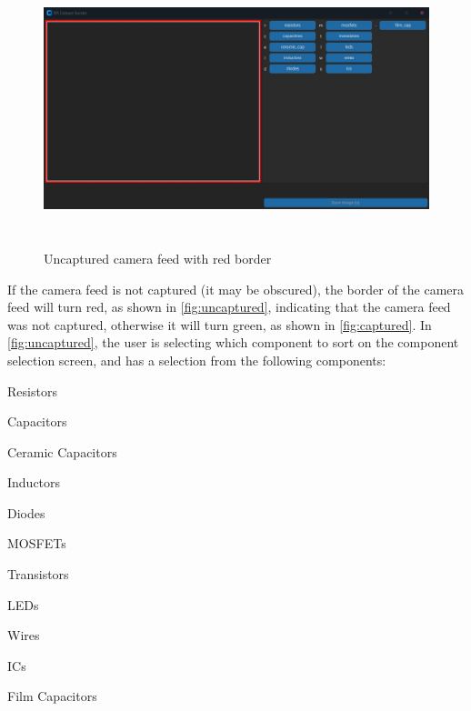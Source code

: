 \begin{figure}[H]
    \hfill
    \begin{minipage}[t]{\textwidth}
      \centering
      \includegraphics[height=8cm]{imgs/python/uncaptured.jpg}
      \caption{Uncaptured camera feed with red border}
        \label{fig:uncaptured}
    \end{minipage}
\end{figure}

If the camera feed is not captured (it may be obscured), the border of the camera feed will turn red, as shown in \autoref{fig:uncaptured}, indicating that the camera feed was not captured, otherwise it will turn green, as shown in \autoref{fig:captured}. In \autoref{fig:uncaptured}, the user is selecting which component to sort on the component selection screen, and has a selection from the following components: 
\begin{multicols}{2}
    \begin{mylist}
        \item Resistors
        \item Capacitors
        \item Ceramic Capacitors
        \item Inductors
        \item Diodes
        \item MOSFETs
        \item Transistors
        \item LEDs
        \item Wires
        \item ICs
        \item Film Capacitors
    \end{mylist}
\end{multicols}

